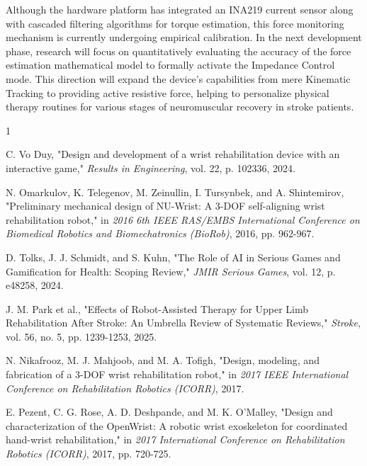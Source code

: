 \documentclass[conference]{IEEEtran}
\begin{document}
Although the hardware platform has integrated an INA219 current sensor along with cascaded filtering algorithms for torque estimation, this force monitoring mechanism is currently undergoing empirical calibration. In the next development phase, research will focus on quantitatively evaluating the accuracy of the force estimation mathematical model to formally activate the Impedance Control mode. This direction will expand the device's capabilities from mere Kinematic Tracking to providing active resistive force, helping to personalize physical therapy routines for various stages of neuromuscular recovery in stroke patients.

\begin{thebibliography}{1}

C. Vo Duy, "Design and development of a wrist rehabilitation device with an interactive game," \textit{Results in Engineering}, vol. 22, p. 102336, 2024.

N. Omarkulov, K. Telegenov, M. Zeinullin, I. Tursynbek, and A. Shintemirov, "Preliminary mechanical design of NU-Wrist: A 3-DOF self-aligning wrist rehabilitation robot," in \textit{2016 6th IEEE RAS/EMBS International Conference on Biomedical Robotics and Biomechatronics (BioRob)}, 2016, pp. 962-967.

D. Tolks, J. J. Schmidt, and S. Kuhn, "The Role of AI in Serious Games and Gamification for Health: Scoping Review," \textit{JMIR Serious Games}, vol. 12, p. e48258, 2024.

J. M. Park et al., "Effects of Robot-Assisted Therapy for Upper Limb Rehabilitation After Stroke: An Umbrella Review of Systematic Reviews," \textit{Stroke}, vol. 56, no. 5, pp. 1239-1253, 2025.

N. Nikafrooz, M. J. Mahjoob, and M. A. Tofigh, "Design, modeling, and fabrication of a 3-DOF wrist rehabilitation robot," in \textit{2017 IEEE International Conference on Rehabilitation Robotics (ICORR)}, 2017.

E. Pezent, C. G. Rose, A. D. Deshpande, and M. K. O'Malley, "Design and characterization of the OpenWrist: A robotic wrist exoskeleton for coordinated hand-wrist rehabilitation," in \textit{2017 International Conference on Rehabilitation Robotics (ICORR)}, 2017, pp. 720-725.

\end{thebibliography}
\end{document}
